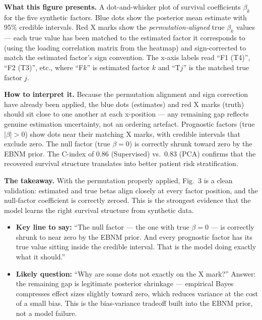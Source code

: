 \documentclass[11pt]{article}
\newcommand{\sectionlabel}[1]{\textbf{#1}}
\begin{document}
\textbf{What this figure presents.} A dot-and-whisker plot of survival coefficients $\beta_k$ for the five synthetic factors. Blue dots show the posterior mean estimate with 95\% credible intervals. Red X marks show the \emph{permutation-aligned} true $\beta_k$ values --- each true value has been matched to the estimated factor it corresponds to (using the loading correlation matrix from the heatmap) and sign-corrected to match the estimated factor's sign convention. The x-axis labels read ``F1 (T4)'', ``F2 (T3)'', etc., where ``F$k$'' is estimated factor $k$ and ``T$j$'' is the matched true factor $j$.

\textbf{How to interpret it.} Because the permutation alignment and sign correction have already been applied, the blue dots (estimates) and red X marks (truth) should sit close to one another at each x-position --- any remaining gap reflects genuine estimation uncertainty, not an ordering artefact. Prognostic factors (true $|\beta| > 0$) show dots near their matching X marks, with credible intervals that exclude zero. The null factor (true $\beta = 0$) is correctly shrunk toward zero by the EBNM prior. The C-index of 0.86 (Supervised) vs.\ 0.83 (PCA) confirms that the recovered survival structure translates into better patient risk stratification.

\textbf{The takeaway.} With the permutation properly applied, Fig.~3 is a clean validation: estimated and true betas align closely at every factor position, and the null-factor coefficient is correctly zeroed. This is the strongest evidence that the model learns the right survival structure from synthetic data.

\begin{itemize}
  \item \sectionlabel{Key line to say:} ``The null factor --- the one with true $\beta = 0$ --- is correctly shrunk to near zero by the EBNM prior. And every prognostic factor has its true value sitting inside the credible interval. That is the model doing exactly what it should.''
  \item \sectionlabel{Likely question:} ``Why are some dots not exactly on the X mark?'' Answer: the remaining gap is legitimate posterior shrinkage --- empirical Bayes compresses effect sizes slightly toward zero, which reduces variance at the cost of a small bias. This is the bias-variance tradeoff built into the EBNM prior, not a model failure.
\end{itemize}

\end{document}
